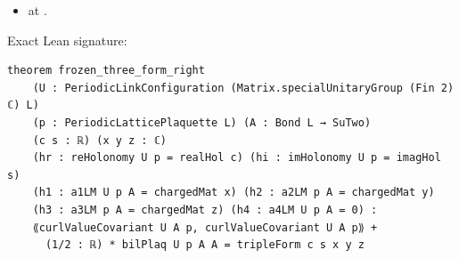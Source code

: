 \begin{theorem}[bp-196]
\begin{itemize}
\item \texttt{} at \texttt{}.
\end{itemize}
\par Exact Lean signature:
\begin{verbatim}
theorem frozen_three_form_right
    (U : PeriodicLinkConfiguration (Matrix.specialUnitaryGroup (Fin 2) ℂ) L)
    (p : PeriodicLatticePlaquette L) (A : Bond L → SuTwo)
    (c s : ℝ) (x y z : ℂ)
    (hr : reHolonomy U p = realHol c) (hi : imHolonomy U p = imagHol s)
    (h1 : a1LM U p A = chargedMat x) (h2 : a2LM p A = chargedMat y)
    (h3 : a3LM p A = chargedMat z) (h4 : a4LM U p A = 0) :
    ⟪curlValueCovariant U A p, curlValueCovariant U A p⟫ +
      (1/2 : ℝ) * bilPlaq U p A A = tripleForm c s x y z
\end{verbatim}
\end{theorem}

